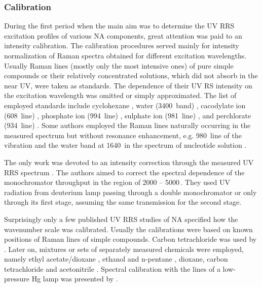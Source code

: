 \subsubsection{Calibration}

During the first period when the main aim was to determine the UV RRS
excitation profiles of various NA components, great attention was paid to an
intensity calibration.
The calibration procedures served mainly for intensity normalization of Raman
spectra obtained for different excitation wavelengths.
Usually Raman lines (mostly only the most intensive ones) of pure simple
compounds or their relatively concentrated solutions, which did not absorb in
the near UV, were taken as standards.
The dependence of their UV RS intensity on the excitation wavelength was
omitted or simply approximated.
The list of employed standards include cyclohexane
\parencite{Hamaguchi1974},
water (3400\,\icm{} band)
\parencite{%
	Chinsky1978,%
	Fodor1985%
},
cacodylate ion (608\,\icm{} line)
\parencite{%
	Blazej1977,%
	Samanta1982%
},
phosphate ion (994\,\icm{} line)
\parencite{Kubasek1985},
sulphate ion (981\,\icm{} line)
\parencite{%
	Perno1989,%
	Benson1992,%
	Wen1998%
},
and perchlorate (934\,\icm{} line)
\parencite{Rodgers1992}.
Some authors employed the Raman lines naturally occurring in the measured
spectrum but without resonance enhancement, e.g. 980\,\icm{} line of the
vibration and the water band at 1640\,\icm{} in the spectrum of nucleotide
solution
\parencite{Tsuboi1974}.

The only work was devoted to an intensity correction through the measured
UV RRS spectrum
\parencite{Chinsky1983a}.
The authors aimed to correct the spectral dependence of the monochromator
throughput in the region of 2000 -- 5000\,\icm.
They used UV radiation from deuterium lamp passing through a double
monochromator or only through its first stage, assuming the same transmission
for the second stage.

Surprisingly only a few published UV RRS studies of NA specified how the
wavenumber scale was calibrated.
Usually the calibrations were based on known positions of Raman lines of
simple compounds.
Carbon tetrachloride was used by
\textcite{Hamaguchi1974}.
Later on, mixtures or sets of separately measured chemicals were employed,
namely ethyl acetate/dioxane
\parencite{Toyama1991},
ethanol and n-pentane
\parencite{Mukerji1995},
dioxane, carbon tetrachloride and acetonitrile
\parencite{Russell1995}.
Spectral calibration with the lines of a low-pressure Hg lamp was presented by
\textcite{Efremov1991}.
